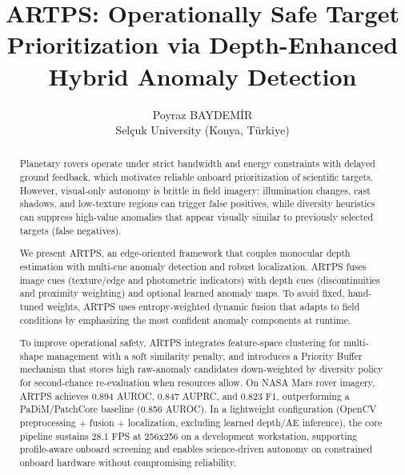 \documentclass[11pt,a4paper]{article}
\title{ARTPS: Operationally Safe Target Prioritization via Depth-Enhanced Hybrid Anomaly Detection}
\author{Poyraz BAYDEM\.{I}R\\Sel\c{c}uk University (Konya, T\"urkiye)}
\date{}
\begin{document}
\maketitle

\begin{abstract}
Planetary rovers operate under strict bandwidth and energy constraints with delayed ground feedback, which motivates reliable onboard prioritization of scientific targets. However, visual-only autonomy is brittle in field imagery: illumination changes, cast shadows, and low-texture regions can trigger false positives, while diversity heuristics can suppress high-value anomalies that appear visually similar to previously selected targets (false negatives).

We present ARTPS, an edge-oriented framework that couples monocular depth estimation with multi-cue anomaly detection and robust localization. ARTPS fuses image cues (texture/edge and photometric indicators) with depth cues (discontinuities and proximity weighting) and optional learned anomaly maps. To avoid fixed, hand-tuned weights, ARTPS uses entropy-weighted dynamic fusion that adapts to field conditions by emphasizing the most confident anomaly components at runtime.

To improve operational safety, ARTPS integrates feature-space clustering for multi-shape management with a soft similarity penalty, and introduces a Priority Buffer mechanism that stores high raw-anomaly candidates down-weighted by diversity policy for second-chance re-evaluation when resources allow. On NASA Mars rover imagery, ARTPS achieves 0.894 AUROC, 0.847 AUPRC, and 0.823 F1, outperforming a PaDiM/PatchCore baseline (0.856 AUROC). In a lightweight configuration (OpenCV preprocessing + fusion + localization, excluding learned depth/AE inference), the core pipeline sustains 28.1 FPS at 256x256 on a development workstation, supporting profile-aware onboard screening and enables science-driven autonomy on constrained onboard hardware without compromising reliability.
\end{abstract}
\end{document}

